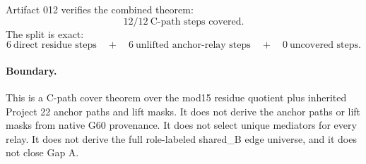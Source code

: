 Artifact 012 verifies the combined theorem:
\[
    12/12\ \text{C-path steps covered}.
\]
The split is exact:
\[
    6\ \text{direct residue steps}
    \quad+\quad
    6\ \text{unlifted anchor-relay steps}
    \quad+\quad
    0\ \text{uncovered steps}.
\]

\paragraph{Boundary.}
This is a C-path cover theorem over the mod15 residue quotient plus inherited Project 22 anchor paths and lift masks.  It does not derive the anchor paths or lift masks from native G60 provenance.  It does not select unique mediators for every relay.  It does not derive the full role-labeled shared\_B edge universe, and it does not close Gap A.
